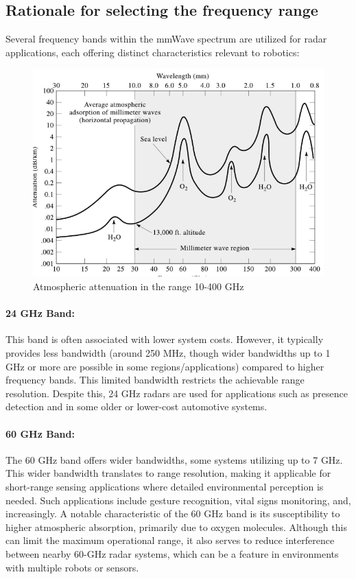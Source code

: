 \subsection{Rationale for selecting the frequency range}
Several frequency bands within the mmWave spectrum are utilized for radar applications, each offering distinct characteristics relevant to robotics:


\begin{figure}[H]
    \centering
    \includegraphics[width=0.75\linewidth]{Src//images/Atmospheric attenuation in the range 10-400 GHz.png}
    \caption{Atmospheric attenuation in the range 10-400 GHz\citep{fcc1997mmwave}}
    \label{fig:Atmospheric}
\end{figure}



\paragraph{24 GHz Band:} This band is often associated with lower system costs. However, it typically provides less bandwidth (around 250 MHz, though wider bandwidths up to 1 GHz or more are possible in some regions/applications) compared to higher frequency bands. This limited bandwidth restricts the achievable range resolution. Despite this, 24 GHz radars are used for applications such as presence detection and in some older or lower-cost automotive systems.

\paragraph{60 GHz Band:} The 60 GHz band offers wider bandwidths, some systems utilizing up to 7 GHz. This wider bandwidth translates to range resolution, making it applicable for short-range sensing applications where detailed environmental perception is needed. Such applications include gesture recognition, vital signs monitoring, and, increasingly. A notable characteristic of the 60 GHz band is its susceptibility to higher atmospheric absorption, primarily due to oxygen molecules. Although this can limit the maximum operational range, it also serves to reduce interference between nearby 60-GHz radar systems, which can be a feature in environments with multiple robots or sensors.

